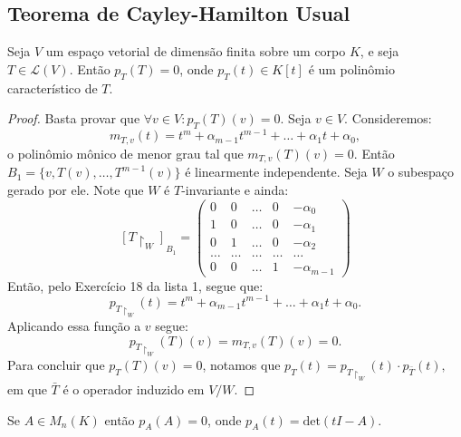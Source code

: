 \documentclass[11pt,twoside,a4paper]{book}
\begin{document}
\subsection{Teorema de Cayley-Hamilton Usual}

\begin{teorema}\label{cayley-hamilton}
Seja \(V\) um espaço vetorial de dimensão finita sobre um corpo \(K\), e seja \(T\in\mathcal{L}(V)\). Então \(p_T(T)=0\), onde \(p_T(t)\in K[t]\) é um polinômio característico de \(T\). 
\end{teorema}
\begin{proof}
Basta provar que \(\forall v\in V:p_T(T)(v)=0\). Seja $v\in V$. Consideremos:
\[
m_{T,v}(t)=t^m+\alpha_{m-1}t^{m-1}+\dots+\alpha_1 t+\alpha_0,
\]
o polinômio mônico de menor grau tal que \(m_{T,v}(T)(v)=0\). Então \(B_1=\{v,T(v),\ldots, T^{m-1}(v)\}\) é linearmente independente. Seja \(W\) o subespaço gerado por ele. Note que \(W\) é \(T\)-invariante e ainda:
\[[T\upharpoonright_W]_{B_1}=\begin{pmatrix}
0 & 0 & \ldots& 0 & -\alpha_0
\\ 1 & 0 & \ldots & 0 & -\alpha_1
\\ 0 & 1 & \ldots & 0 & -\alpha_2
\\ \ldots & \ldots  & \ldots  & \ldots  & \ldots \
\\ 0 & 0 & \ldots & 1 & -\alpha_{m-1} 
\end{pmatrix}\]
Então, pelo Exercício 18 da lista 1, segue que:
\[
p_{T \upharpoonright_{W}}(t)=
t^m + \alpha_{m-1}t^{m-1} + \ldots + \alpha_1t+\alpha_0.\]
Aplicando essa função a \(v\) segue:
\[p_{T \upharpoonright_{W}}(T)(v)=m_{T,v}(T)(v)=0.\]
Para concluir que \(p_T(T)(v)=0\), notamos que \(p_T(t)=p_{T\upharpoonright_W}(t)\cdot p_{\bar{T}}(t),\) em que $\bar{T}$ é o operador induzido em $V/W$.
\end{proof}
\begin{corolario}
Se \(A\in M_n(K)\) então \(p_A(A)=0\),
onde \(p_A(t)=\text{det}(tI -A)\). \end{corolario}
\end{document}
